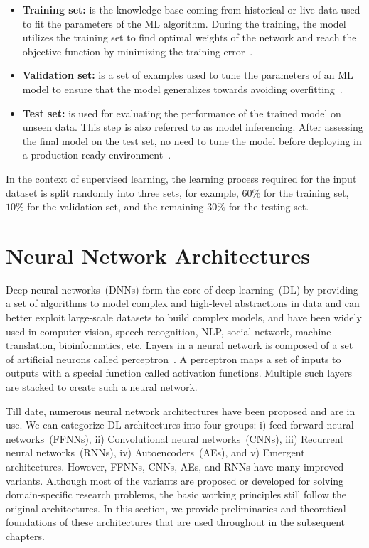 \vspace{-1mm}
\begin{itemize}[noitemsep]
    \item \textbf{Training set:} is the knowledge base coming from historical or live data used to fit the parameters of the ML algorithm. During the training, the model utilizes the training set to find optimal weights of the network and reach the objective function by minimizing the training error~\cite{karim2018java}. 
    \item \textbf{Validation set:} is a set of examples used to tune the parameters of an ML model to ensure that the model generalizes towards avoiding overfitting~\cite{karim2018java}. 
    \item \textbf{Test set:} is used for evaluating the performance of the trained model on unseen data. This step is also referred to as model inferencing. After assessing the final model on the test set, no need to tune the model before deploying in a production-ready environment~\cite{karim2018java}.
\end{itemize}
\vspace{-1mm}

\hspace*{3.5mm} In the context of supervised learning, the learning process required for the input dataset is split randomly into three sets, for example, $60\%$ for the training set, $10\%$ for the validation set, and the remaining $30\%$ for the testing set.

\section{Neural Network Architectures}
Deep neural networks~(DNNs) form the core of deep learning~(DL) by providing a set of algorithms to model complex and high-level abstractions in data and can better exploit large-scale datasets to build complex models, and have been widely used in computer vision, speech recognition, NLP, social network, machine translation, bioinformatics, etc. Layers in a neural network is composed of a set of artificial neurons called perceptron~\cite{yuan2019adversarial}. A perceptron maps a set of inputs to outputs with a special function called activation functions. Multiple such layers are stacked to create such a neural network. 

\hspace*{3.5mm} Till date, numerous neural network architectures have been proposed and are in use. We can categorize DL architectures into four groups: i) feed-forward neural networks~(FFNNs), ii) Convolutional neural networks~(CNNs), iii) Recurrent neural networks~(RNNs), iv) Autoencoders~(AEs), and v) Emergent architectures. However, FFNNs, CNNs, AEs, and RNNs have many improved variants. Although most of the variants are proposed or developed for solving domain-specific research problems, the basic working principles still follow the original  architectures. In this section, we provide preliminaries and theoretical foundations of these architectures that are used throughout in the subsequent chapters.  

